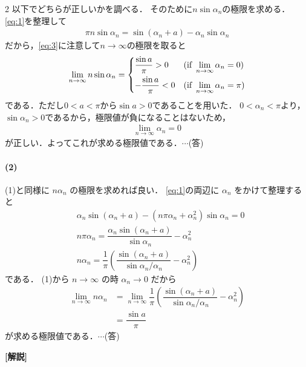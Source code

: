 \documentclass[../../main.tex]{subfiles}
\begin{document}
\begin{multicols}{2}
  以下でどちらが正しいかを調べる．
  そのために$n\sin\alpha_n$の極限を求める．
  \cref{eq:1}を整理して
  \begin{align}
    \pi n \sin \alpha_n = \sin (\alpha_n+a) - \alpha_n \sin \alpha_n
  \end{align}
  だから，\cref{eq:3}に注意して$n\to\infty$の極限を取ると
  \begin{align}
    \lim_{n\to\infty} n \sin \alpha_n =
    \begin{dcases}
      \dfrac{\sin a}{\pi} >0  & (\text{if } \lim_{n\to\infty} \alpha_n = 0)   \\
      -\dfrac{\sin a}{\pi} <0 & (\text{if } \lim_{n\to\infty} \alpha_n = \pi)
    \end{dcases}
  \end{align}
  である．ただし$0<a<\pi$から$\sin a>0$であることを用いた．
  $0<\alpha_n<\pi$より，$\sin \alpha_n>0$であるから，極限値が負になることはないため，
  \begin{align}
    \lim_{n\to\infty} \alpha_n = 0
  \end{align}
  が正しい．よってこれが求める極限値である．$\cdots$(答)

  \paragraph{(2)}

  (1)と同様に $n\alpha_n$ の極限を求めれば良い．
  \cref{eq:1}の両辺に $\alpha_n$ をかけて整理すると
  \begin{align}
    & \alpha_n\sin (\alpha_n+a) - (n\pi \alpha_n+\alpha^2_n) \sin \alpha_n = 0                            \\
    & n\pi \alpha_n = \dfrac{\alpha_n\sin (\alpha_n+a)}{\sin \alpha_n } - \alpha^2_n                       \\
    & n \alpha_n = \dfrac{1}{\pi}\left(\dfrac{\sin(\alpha_n+a)}{\sin \alpha_n/\alpha_n} - \alpha_n^2\right)
  \end{align}
  である．
  (1)から $n\to\infty$ の時 $\alpha_n \to 0$ だから
  \begin{align}
    \lim_{n\to\infty} n \alpha_n
    & =     \lim_{n\to\infty} \dfrac{1}{\pi}\left(\dfrac{\sin(\alpha_n+a)}{\sin \alpha_n/\alpha_n} - \alpha_n^2\right) \\
    & =    \dfrac{\sin a}{\pi}
  \end{align}
  が求める極限値である．$\cdots$(答)

  {\bf [解説]}

  \newpage
\end{multicols}
\end{document}
